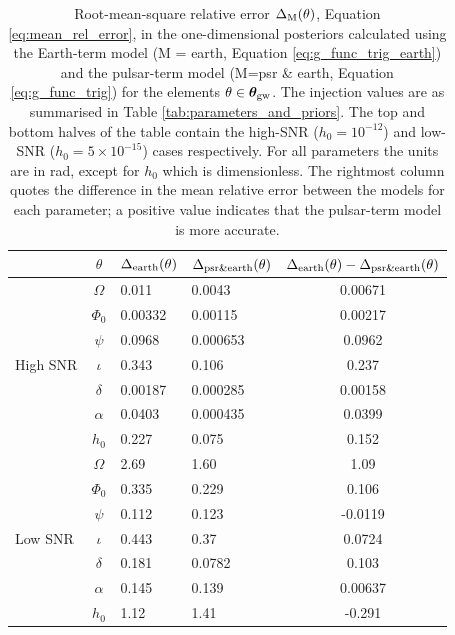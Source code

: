 \documentclass[fleqn,usenatbib,useAMS]{mnras}
\begin{document}
\begin{table}
	\centering
		\begin{tabular}{lcllc}
			\toprule
			&$\theta$ & $\Delta_{\rm earth}(\theta)$ & $\Delta_{\rm psr \& earth}(\theta)$ & $\Delta_{\rm earth}(\theta) - \Delta_{\rm psr \& earth}(\theta)$   \\
			\hline
			\multirow{7}{2mm}{High SNR} & $\Omega$       & 0.011& 0.0043& 0.00671\\
			& $\Phi_0$ &0.00332 &0.00115 &0.00217\\
			& $\psi$ &0.0968 &0.000653 &0.0962 \\
			& $\iota$ & 0.343 &0.106 &0.237 \\
			& $\delta$ & 0.00187 &0.000285 &0.00158 \\
			&$\alpha$ &0.0403 &0.000435 &0.0399 \\
			&$h_0$ & 0.227 &0.075 &0.152 \\
			\hline
			\multirow{7}{2mm}{Low SNR} & $\Omega$       & 2.69 &1.60& 1.09 \\
			& $\Phi_0$ &0.335 &0.229 &0.106 \\
			& $\psi$ &0.112 &0.123 &-0.0119 \\
			& $\iota$ & 0.443 &0.37 &0.0724 \\
			& $\delta$ & 0.181 &0.0782 &0.103 \\
			&$\alpha$ &0.145 &0.139 &0.00637 \\
			&$h_0$ & 1.12 &1.41 &-0.291 \\
			\bottomrule
		\end{tabular}
		\caption{Root-mean-square relative error $\Delta_{\rm M}(\theta)$, Equation \eqref{eq:mean_rel_error}, in the one-dimensional posteriors calculated using the Earth-term model (M = earth, Equation \eqref{eq:g_func_trig_earth}) and the pulsar-term model (M=psr \& earth, Equation \eqref{eq:g_func_trig}) for the elements $\theta \in \boldsymbol{\theta}_{\rm gw}$. The injection values are as summarised in Table \ref{tab:parameters_and_priors}. The top and bottom halves of the table contain the high-SNR ($h_0 = 10^{-12}$) and low-SNR ($h_0 = 5 \times 10^{-15}$) cases respectively.  For all parameters the units are in rad, except for $h_0$ which is dimensionless. The rightmost column quotes the difference in the mean relative error between the models for each parameter; a positive value indicates that the pulsar-term model is more accurate.}
		\label{tab:posterior_errors}
	\end{table}
\end{document}
